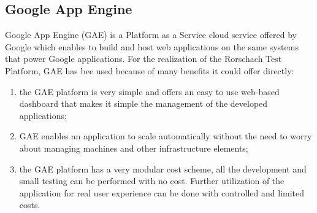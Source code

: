 \label{sec:GAE}
\subsection{Google App Engine}
Google App Engine (GAE) is a Platform as a Service cloud service offered by Google which enables to build and host web applications on the same systems that power
Google applications.
For the realization of the Rorschach Test Platform, GAE has bee used because of many benefits it could offer directly:

\begin{enumerate}
\item the GAE platform is very simple and offers an easy to use web-based dashboard that makes it simple the management of the developed applications;
\item GAE enables an application to scale automatically without the need to worry about managing machines and other infrastructure elements;
\item the GAE platform has a very modular cost scheme, all the development and small testing can be performed with no cost.
Further utilization of the application for real user experience can be done with controlled and limited costs.
\end{enumerate}

